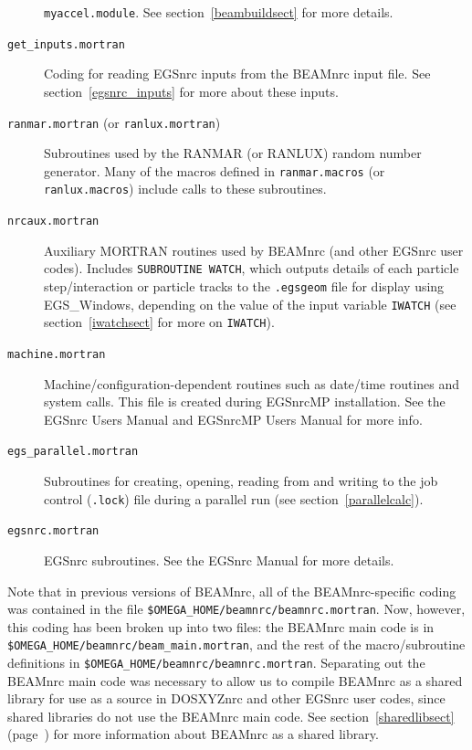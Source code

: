 \documentclass[12pt,twoside]{article}
\begin{document}
\begin{description}
{\tt myaccel.module}.  See section~\ref{beambuildsect} for more details.
\item [{\tt get\_inputs.mortran}] Coding for reading EGSnrc inputs from
the BEAMnrc input file.  See section~\ref{egsnrc_inputs} for more about these
inputs.
\item [{\tt ranmar.mortran} (or {\tt ranlux.mortran})] Subroutines used
by the RANMAR (or RANLUX) random number generator.  Many of the
macros defined in {\tt ranmar.macros} (or {\tt ranlux.macros}) include
calls to these subroutines.
\item [{\tt nrcaux.mortran}] Auxiliary MORTRAN routines used by
BEAMnrc (and other EGSnrc user codes).  Includes
{\tt SUBROUTINE WATCH}, which outputs details of each
particle step/interaction or particle tracks to the {\tt .egsgeom} file
for display using EGS\_Windows, depending on the value of the
input variable {\tt IWATCH} (see section~\ref{iwatchsect} for more
on {\tt IWATCH}).
\item [{\tt machine.mortran}]  Machine/configuration-dependent routines
such as date/time routines and system calls.  This file is created during
EGSnrcMP installation.  See the EGSnrc Users Manual\cite{KR03} and
EGSnrcMP Users Manual\cite{Ka03} for more info.
\item [{\tt egs\_parallel.mortran}] Subroutines for creating, opening,
reading from and writing to the job control ({\tt .lock}) file
during a parallel run (see section~\ref{parallelcalc}).
\item [{\tt egsnrc.mortran}] EGSnrc subroutines.  See the EGSnrc
Manual\cite{KR03} for more details.
\end{description}

Note that in previous versions of BEAMnrc, all of the BEAMnrc-specific
coding was contained in the file {\tt \$OMEGA\_HOME/beamnrc/beamnrc.mortran}.
Now, however, this coding has been broken up into two files: the
BEAMnrc main code is in \\{\tt \$OMEGA\_HOME/beamnrc/beam\_main.mortran}, and
the rest of the macro/subroutine definitions in
{\tt \$OMEGA\_HOME/beamnrc/beamnrc.mortran}.  Separating out the BEAMnrc
main code was necessary to allow us to compile BEAMnrc as a shared
library for use as a source in DOSXYZnrc and other EGSnrc user codes,
since shared libraries do not use the BEAMnrc main code.
See section~\ref{sharedlibsect} (page~\pageref{sharedlibsect}) for more
information about BEAMnrc as a shared library.
\end{document}
